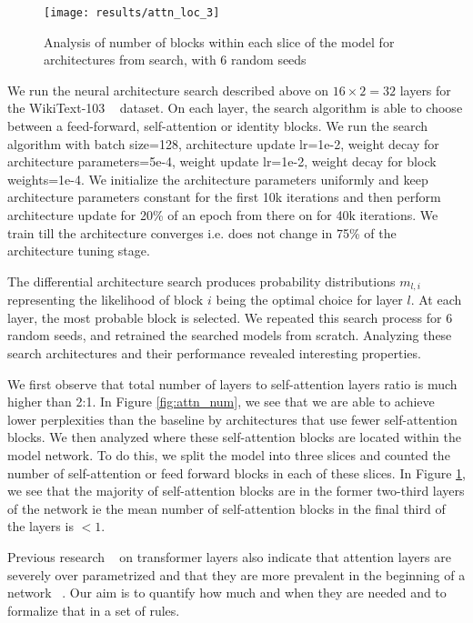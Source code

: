 \documentclass[11pt]{article}
\begin{document}
\begin{figure}
\centering
\texttt{[image: results/attn\_loc\_3]}
\caption{Analysis of number of blocks within each slice of the model for architectures from search, with 6 random seeds}
\label{fig:attn_loc}
\end{figure}


We run the neural architecture search described above on $16 \times 2=32$ layers for the WikiText-103 ~\citep{wikitext103} dataset. On each layer, the search algorithm is able to choose between a feed-forward, self-attention or identity blocks. We run the search algorithm with batch size=128, architecture update lr=1e-2, weight decay for architecture parameters=5e-4, weight update lr=1e-2, weight decay for block weights=1e-4. We initialize the architecture parameters uniformly and keep architecture parameters constant for the first 10k iterations and then perform architecture update for 20\% of an epoch from there on for 40k iterations. We train till the architecture converges i.e. does not change in 75\% of the architecture tuning stage.

The differential architecture search produces probability distributions $m_{l,i}$ representing the likelihood of block $i$ being the optimal choice for layer $l$. At each layer, the most probable block is selected. We repeated this search process for 6 random seeds, and retrained the searched models from scratch. Analyzing these search architectures and their performance revealed interesting properties.

We first observe that total number of layers to self-attention layers ratio is much higher than 2:1. In Figure \ref{fig:attn_num}, we see that we are able to achieve lower perplexities than the baseline by architectures that use fewer self-attention blocks. We then analyzed where these self-attention blocks are located within the model network. To do this, we split the model into three slices and counted the number of self-attention or feed forward blocks in each of these slices. In Figure \ref{fig:attn_loc}, we see that the majority of self-attention blocks are in the former two-third layers of the network ie the mean number of self-attention blocks in the final third of the layers is $<1$.

Previous research ~\citep{darksecretsofbert,collaborate} on transformer layers also indicate that attention layers are severely over parametrized and that they are more prevalent in the beginning of a network ~\citep{SandwichTransformer}. Our aim is to quantify how much and when they are needed and to formalize that in a set of rules.
\end{document}
